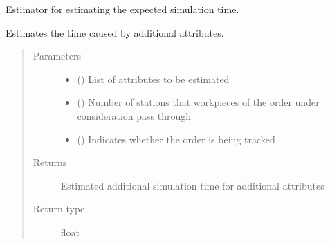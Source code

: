 \documentclass[letterpaper,10pt,english]{sphinxmanual}
\begin{document}
\begin{fulllineitems}
\label{\detokenize{source/API/api:estimator.Estimator}}
\sphinxAtStartPar
Estimator for estimating the expected simulation time.

\begin{fulllineitems}
\label{\detokenize{source/API/api:estimator.Estimator.est_attribute}}
\sphinxAtStartPar
Estimates the time caused by additional attributes.
\begin{quote}\begin{description}
\item[{Parameters}] \leavevmode\begin{itemize}
\item {} 
\sphinxAtStartPar
{} (\sphinxstyleliteralemphasis{\sphinxupquote{{[}}}\sphinxstyleliteralemphasis{\sphinxupquote{{]}}}) \textendash{} List of attributes to be estimated

\item {} 
\sphinxAtStartPar
{} () \textendash{} Number of stations that workpieces of the order under consideration pass through

\item {} 
\sphinxAtStartPar
{} () \textendash{} Indicates whether the order is being tracked

\end{itemize}

\item[{Returns}] \leavevmode
\sphinxAtStartPar
Estimated additional simulation time for additional attributes

\item[{Return type}] \leavevmode
\sphinxAtStartPar
float


\end{description}
\end{quote}
\end{fulllineitems}
\end{fulllineitems}
\end{document}
